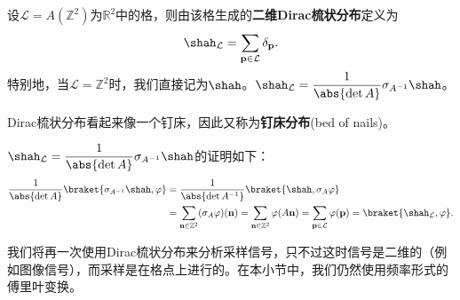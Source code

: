 \begin{definition}[Dirac梳状分布]
    设$\mathcal{L}=A(\mathbb{Z}^2)$为$\mathbb{R}^2$中的格，则由该格生成的\textbf{二维Dirac梳状分布}定义为
    \begin{equation}
        \shah_{\mathcal{L}}=\sum_{\mathbf{p}\in\mathcal{L}}\delta_{\mathbf{p}}.
    \end{equation}
    特别地，当$\mathcal{L}=\mathbb{Z}^2$时，我们直接记为$\shah$。$\displaystyle\shah_{\mathcal{L}}=\frac{1}{\abs{\det A}}\sigma_{A^{-1}}\shah$。

    Dirac梳状分布看起来像一个钉床，因此又称为\textbf{钉床分布}(bed of nails)。
\end{definition}
\begin{remark}
    $\displaystyle\shah_{\mathcal{L}}=\frac{1}{\abs{\det A}}\sigma_{A^{-1}}\shah$的证明如下：
    \begin{align}
        \frac{1}{\abs{\det A}}\braket{\sigma_{A^{-1}}\shah,\varphi}&=\frac{1}{\abs{\det A^{-1}}}\braket{\shah,\sigma_A\varphi}\nonumber\\
        &=\sum_{\mathbf{n}\in\mathbb{Z}^2}(\sigma_A\varphi)(\mathbf{n})=\sum_{\mathbf{n}\in\mathbb{Z}^2}\varphi(A\mathbf{n})=\sum_{\mathbf{p}\in\mathcal{L}}\varphi(\mathbf{p})=\braket{\shah_{\mathcal{L}},\varphi}.
    \end{align}
\end{remark}

我们将再一次使用Dirac梳状分布来分析采样信号，只不过这时信号是二维的（例如图像信号），而采样是在格点上进行的。在本小节中，我们仍然使用频率形式的傅里叶变换。

